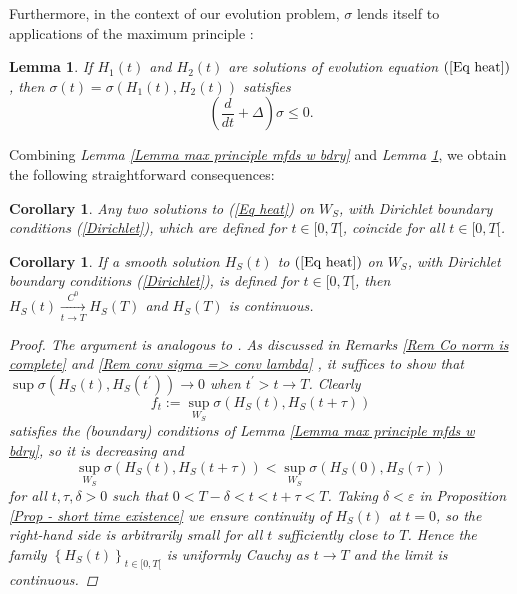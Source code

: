 \documentclass{article}
\newtheorem{corollary}[theorem]{Corollary}
\newtheorem{lemma}[theorem]{Lemma}
\begin{document}
Furthermore, in the context of our
evolution problem, $\sigma $ lends itself to applications of the maximum
principle \cite[Proposition 13]{ASDYM}:

\begin{lemma}         \label{Lemma max prin for sigma}
If $H_{1}(t) $ and $H_{2}(t)$ are solutions of evolution equation $\left( \ref{Eq heat}\right) $, then $\sigma (t) =\sigma \left( H_{1}(t),H_{2}(t) \right)$ satisfies%
\begin{equation*}
        \left( \frac{d}{dt}+\Delta \right) \sigma \leq 0.
\end{equation*}
\end{lemma}

Combining \emph{Lemma \ref{Lemma max principle mfds w bdry}} and \emph{Lemma \ref{Lemma max prin for sigma}}, we  obtain the following straightforward consequences:
\begin{corollary}       \label{cor uniqueness}
Any two solutions to (\ref{Eq heat}) on $W_{S}$, with Dirichlet boundary
conditions (\ref{Dirichlet}), which are defined for $t\in[0,T[$, coincide for all $t\in[0,T[$. 
\end{corollary}
\begin{corollary}       \label{Cor H(t) -> H(T) in C0}
If a smooth solution $H_{S}\left( t\right) $ to $\left( \ref{Eq heat}\right) $ on $W_{S}$, with Dirichlet boundary
conditions (\ref{Dirichlet}), is defined for $t\in[0,T[$, then 
$H_{S}\left( t\right) 
\underset{t\to T}{\overset{C^{0}}{\longrightarrow }}H_{S}\left( T\right)$ and $H_{S}\left( T\right) $ is continuous.
\begin{proof}
The argument is analogous to \cite[Corollary 15]{ASDYM}. As discussed in \emph{Remarks \ref{Rem Co norm is complete} }and \emph{\ref{Rem conv sigma => conv lambda}}%
, it suffices to show that $\sup \sigma \left( H_{S}\left( t\right)
,H_{S}\left( t^{\prime }\right) \right)\to0 $ when $t^{\prime
}>t\rightarrow T$. Clearly 
$$
f_{t}:=\sup\limits_{W_{S}}
        \sigma \left(H_{S}\left( t\right) ,H_{S}\left( t+\tau \right) \right)
$$ 
satisfies the (boundary) conditions of \emph{Lemma \ref{Lemma max principle mfds w bdry}},
 so it is decreasing and 
\begin{equation*}
        \sup_{W_{S}}\sigma\left(H_{S}\left(t\right),
        H_{S}\left(t+\tau\right)\right)
        <\sup_{W_{S}}\sigma\left( H_{S}\left( 0\right) ,
        H_{S}\left( \tau \right)\right)
\end{equation*}%
for all $t,\tau ,\delta >0$ such that $0<T-\delta <t<t+\tau <T$. Taking $%
\delta <\varepsilon $ in \emph{Proposition \ref{Prop - short time existence}}
we ensure continuity of $H_{S}\left( t\right) $ at $t=0$, so the right-hand
side is arbitrarily small for all $t$ sufficiently close to $T$. Hence the family $\left\{H_{S}\left( t\right)\right\}_{t\in[0,T[} $ is uniformly Cauchy as $t\rightarrow T$ and the limit is continuous.%
\end{proof}
\end{corollary}
 
\end{document}
